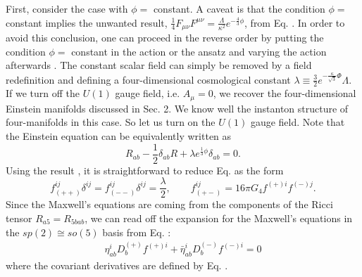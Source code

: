 \documentclass[12pt,epsf]{article}
\begin{document}
First, consider the case with $\phi = $ constant.
A caveat is that the condition $\phi = $ constant implies the unwanted result,
$\frac{1}{4} F_{\mu\nu} F^{\mu\nu} = \frac{\Lambda}{\kappa^2} e^{-\frac{4}{3} \phi}$,
from Eq. . In order to avoid this conclusion, one can proceed in the reverse order
by putting the condition $\phi = $ constant in the action  or the ansatz 
and varying the action afterwards \cite{kk-book}.
The constant scalar field can simply be removed by a field redefinition
and defining a four-dimensional cosmological constant
$\lambda \equiv \frac{3}{2} e^{- \frac{\kappa}{\sqrt{3}} \Phi} \Lambda$.
If we turn off the $U(1)$ gauge field, i.e. $A_\mu = 0$, we recover the four-dimensional Einstein manifolds
discussed in Sec. 2. We know well the instanton structure of four-manifolds in this case.
So let us turn on the $U(1)$ gauge field.
Note that the Einstein equation  can be equivalently written as
\begin{equation}\label{ein-eq-5dim}
  R_{ab} - \frac{1}{2} \delta_{ab} R + \lambda e^{\frac{1}{3} \phi} \delta_{ab} = 0.
\end{equation}
Using the result ,
it is straightforward to reduce Eq.  as the form \cite{oh-yang,joy-jhep}
\begin{equation}\label{eins-beq}
f^{ij}_{(++)} \delta^{ij} = f^{ij}_{(--)} \delta^{ij} = \frac{\lambda}{2},
\qquad f^{ij}_{(+-)} = 16 \pi G_4 f^{(+)i} f^{(-)j}.
\end{equation}
Since the Maxwell's equations are coming from the components of the Ricci tensor $R_{a5}=R_{5bab}$,
we can read off the expansion for the Maxwell's equations in the $sp(2) \cong so(5)$ basis from Eq. :
\begin{eqnarray} \label{maxeq-sp2}
\eta^i_{ab} D_b^{(+)} f^{(+)i} + \bar{\eta}^i_{ab} D_b^{(-)} f^{(-)i} = 0
\end{eqnarray}
where the covariant derivatives are defined by Eq. .
\end{document}
